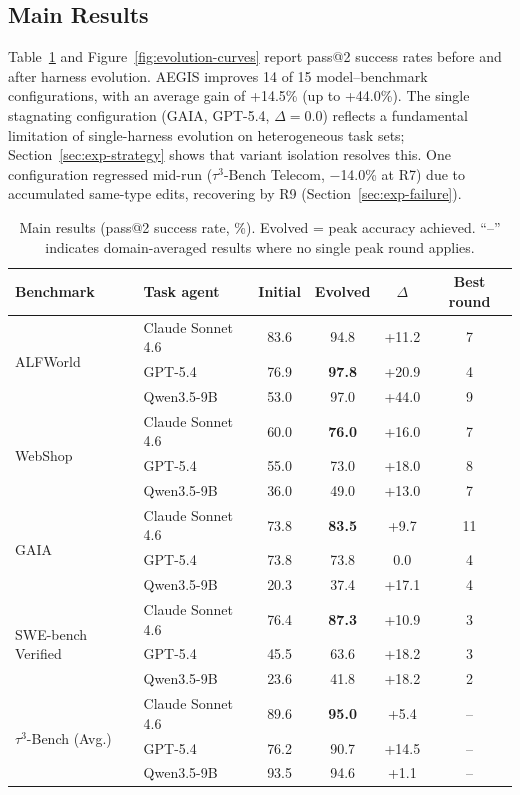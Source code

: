 \subsection{Main Results}
\label{sec:exp-main}

Table~\ref{tab:main-results} and Figure~\ref{fig:evolution-curves} report pass@2 success rates before and after harness evolution. AEGIS improves 14 of 15 model--benchmark configurations, with an average gain of +14.5\% (up to +44.0\%). The single stagnating configuration (GAIA, GPT-5.4, $\Delta{=}0.0$) reflects a fundamental limitation of single-harness evolution on heterogeneous task sets; Section~\ref{sec:exp-strategy} shows that variant isolation resolves this. One configuration regressed mid-run ($\tau^3$-Bench Telecom, $-$14.0\% at R7) due to accumulated same-type edits, recovering by R9 (Section~\ref{sec:exp-failure}).



\begin{table}[!htbp]
\centering
\small
\caption{Main results (pass@2 success rate, \%). Evolved = peak accuracy achieved. ``--'' indicates domain-averaged results where no single peak round applies.}
\label{tab:main-results}
\begin{tabular}{llcccc}
\toprule
\textbf{Benchmark} & \textbf{Task agent} & \textbf{Initial} & \textbf{Evolved} & \textbf{$\Delta$} & \textbf{Best round} \\
\midrule
\multirow{3}{*}{ALFWorld}
  & Claude Sonnet 4.6 & 83.6 & 94.8 & +11.2 & 7 \\
  & GPT-5.4           & 76.9 & \textbf{97.8} & +20.9 & 4 \\
  & Qwen3.5-9B        & 53.0 & 97.0 & +44.0 & 9 \\
\midrule
\multirow{3}{*}{WebShop}
  & Claude Sonnet 4.6 & 60.0 & \textbf{76.0} & +16.0 & 7 \\
  & GPT-5.4           & 55.0 & 73.0 & +18.0 & 8 \\
  & Qwen3.5-9B        & 36.0 & 49.0 & +13.0 & 7 \\
\midrule
\multirow{3}{*}{GAIA}
  & Claude Sonnet 4.6 & 73.8 & \textbf{83.5} & +9.7 & 11 \\
  & GPT-5.4           & 73.8 & 73.8 & 0.0 & 4 \\
  & Qwen3.5-9B        & 20.3 & 37.4 & +17.1 & 4 \\
\midrule
\multirow{3}{*}{SWE-bench Verified}
  & Claude Sonnet 4.6 & 76.4 & \textbf{87.3} & +10.9 & 3 \\
  & GPT-5.4           & 45.5 & 63.6 & +18.2 & 3 \\
  & Qwen3.5-9B        & 23.6 & 41.8 & +18.2 & 2 \\
\midrule
\multirow{3}{*}{$\tau^3$-Bench (Avg.)}
  & Claude Sonnet 4.6 & 89.6 & \textbf{95.0} & +5.4 & -- \\
  & GPT-5.4           & 76.2 & 90.7 & +14.5 & -- \\
  & Qwen3.5-9B        & 93.5 & 94.6 & +1.1 & -- \\
\bottomrule
\end{tabular}
\end{table}



